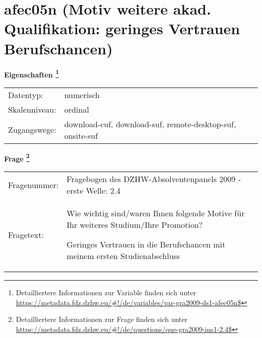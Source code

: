 
    \setcounter{footnote}{0}

    \vspace*{-1.8cm}
	\section{afec05n (Motiv weitere akad. Qualifikation: geringes Vertrauen Berufschancen)}
	\label{section:afec05n}



    \vspace*{0.5cm}
    \noindent\textbf{Eigenschaften
	\footnote{Detailliertere Informationen zur Variable finden sich unter
		\url{https://metadata.fdz.dzhw.eu/\#!/de/variables/var-gra2009-ds1-afec05n$}}}\\
	\begin{tabularx}{\hsize}{@{}lX}
	Datentyp: & numerisch \\
	Skalenniveau: & ordinal \\
	Zugangswege: &
	  download-cuf, 
	  download-suf, 
	  remote-desktop-suf, 
	  onsite-suf
 \\
    \end{tabularx}



				\vspace*{0.5cm}
                \noindent\textbf{Frage
	                \footnote{Detailliertere Informationen zur Frage finden sich unter
		              \url{https://metadata.fdz.dzhw.eu/\#!/de/questions/que-gra2009-ins1-2.4$}}}\\
				\begin{tabularx}{\hsize}{@{}lX}
					Fragenummer: &
					  Fragebogen des DZHW-Absolventenpanels 2009 - erste Welle:
					  2.4
 \\
					Fragetext: & Wie wichtig sind/waren Ihnen folgende Motive für Ihr weiteres Studium/Ihre Promotion?\par  Geringes Vertrauen in die Berufschancen mit meinem ersten Studienabschluss \\
				\end{tabularx}





